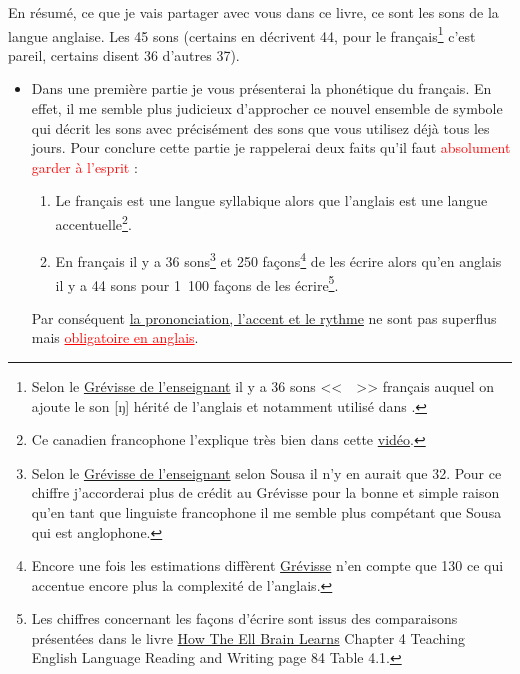 En résumé, ce que je vais partager avec vous dans ce livre, ce
sont les sons de la langue anglaise. Les 45 sons (certains en
décrivent 44, pour le français\footnote{Selon le
  \href{https://www.amazon.fr/gp/product/221010632X/ref=as_li_tl?ie=UTF8&camp=1642&creative=6746&creativeASIN=221010632X&linkCode=as2&tag=wwwbecomefree-21&linkId=c8c522ee07ffc9188dd9a768e39d88e0}{Grévisse
  de l'enseignant} il y a 36 sons <<~~>> français
auquel on ajoute le son [ŋ] hérité de l'anglais et notamment utilisé dans .} c'est pareil, certains disent 36
d'autres 37).\par
\begin{itemize}
\item Dans une première partie je vous présenterai la phonétique du
français. En effet, il me semble plus judicieux d'approcher ce nouvel
ensemble de symbole qui décrit les sons avec précisément des sons que
vous utilisez déjà tous les jours.  Pour conclure cette partie je
rappelerai deux faits qu'il faut \textcolor{red}{absolument garder à l'esprit} :
\begin{enumerate}
\item Le français est une langue syllabique alors que l'anglais est
  une langue accentuelle\footnote{Ce canadien francophone l'explique
    très bien dans cette
    \href{https://youtu.be/EjVHGsRCf8M?t=4m45s}{vidéo}.}.
\item En français il y a 36 sons\footnote{Selon le
  \href{https://www.amazon.fr/gp/product/221010632X/ref=as_li_tl?ie=UTF8&camp=1642&creative=6746&creativeASIN=221010632X&linkCode=as2&tag=wwwbecomefree-21&linkId=c8c522ee07ffc9188dd9a768e39d88e0}{Grévisse
  de l'enseignant} selon Sousa il n'y en aurait que 32. Pour ce
chiffre j'accorderai plus de crédit au Grévisse pour la bonne et
simple raison qu'en tant que linguiste francophone il me semble plus
compétant que Sousa qui est anglophone.} et 250 façons\footnote{Encore une
fois les estimations diffèrent
\href{https://www.amazon.fr/gp/product/221010632X/ref=as_li_tl?ie=UTF8&camp=1642&creative=6746&creativeASIN=221010632X&linkCode=as2&tag=wwwbecomefree-21&linkId=c8c522ee07ffc9188dd9a768e39d88e0}{Grévisse}
n'en compte que 130 ce qui accentue encore plus la complexité de l'anglais.} de les écrire alors
  qu'en anglais il y a 44 sons pour 1~100 façons de les
  écrire\footnote{Les chiffres concernant les façons d'écrire sont
    issus des comparaisons présentées dans le livre
    \href{https://www.amazon.fr/gp/product/B00M0GDXN8/ref=as_li_tl?ie=UTF8&camp=1642&creative=6746&creativeASIN=B00M0GDXN8&linkCode=as2&tag=wwwbecomefree-21&linkId=e782cf430858413ec9135fcef1644b20}{How
      The Ell Brain Learns} Chapter 4 Teaching English Language
    Reading and Writing page 84 Table 4.1.}.
\end{enumerate}
Par conséquent \underline{la prononciation, l'accent et le rythme} ne sont pas
superflus mais \textcolor{red}{\underline{obligatoire en anglais}}.\par


\end{itemize}
